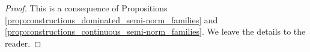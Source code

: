 \documentclass [11pt,reqno]{amsart}
\newcommand{\1}{\mathmybb{1}}
\def\um{\operatorname{um}}
\begin{document}
\begin{proof}
This is a consequence of Propositions \ref{prop:constructions_dominated_semi-norm_families} and \ref{prop:constructions_continuous_semi-norm_families}. We leave the details to the reader.

\end{proof}
\end{document}
